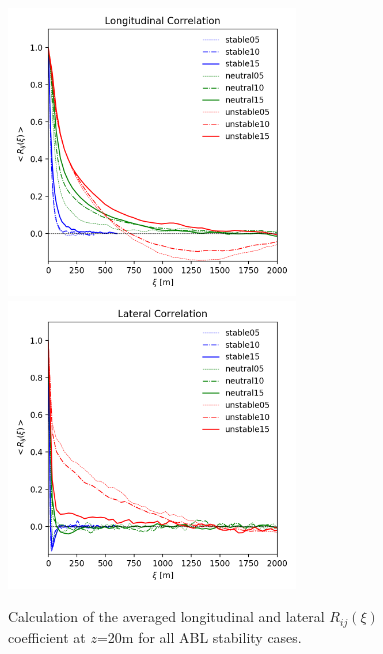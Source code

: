 \begin{figure}[hbt!]
  \label{fig:AllStabilityRij}
  \centering
  \includegraphics[width=3in]{figures/AllStability_Rij_Longitudinal.png}
  \includegraphics[width=3in]{figures/AllStability_Rij_Lateral.png}
  \caption{Calculation of the averaged longitudinal and lateral
    $R_{ij}(\xi)$ coefficient at $z$=20m for all ABL stability cases.}
\end{figure}

